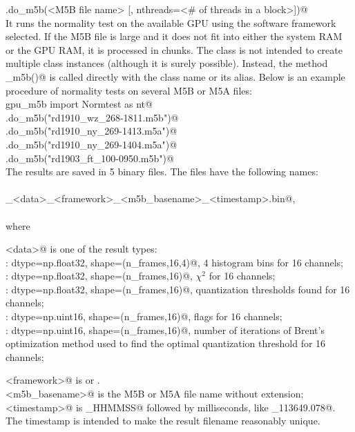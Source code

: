 \documentclass[letterpaper,twoside,12pt]{article}
\begin{document}
\noindent \verb@Normtest.do_m5b(<M5B file name> [, nthreads=<# of threads in a block>])@ \\

 It runs the normality test on the available GPU using the software framework selected. If the M5B file is large and it does not fit into either the system RAM or the GPU RAM, it is processed in chunks. The \verb@Normtest@ class is not intended to create multiple class instances (although it is surely possible). Instead, the method \verb@do_m5b()@ is called directly with the class name or its alias. Below is an example procedure of normality tests on several M5B or M5A files: \\

\noindent
\verb@from gpu_m5b import Normtest as nt@  \\
\verb@nt.do_m5b("rd1910_wz_268-1811.m5b")@ \\
\verb@nt.do_m5b("rd1910_ny_269-1413.m5a")@ \\
\verb@nt.do_m5b("rd1910_ny_269-1404.m5a")@ \\
\verb@nt.do_m5b("rd1903_ft_100-0950.m5b")@ \\

The results are saved in 5 binary files. The files have the following names: \\\\
\verb@nt_<data>_<framework>_<m5b_basename>_<timestamp>.bin@, \\\\
\noindent where

\noindent \verb@<data>@ is one of the result types: \\
\indent \verb@hist:   dtype=np.float32, shape=(n_frames,16,4)@, 4 histogram bins for 16 channels; \\
\indent {}:   dtype=np.float32, shape=(n_frames,16)@, $\chi^2$ for 16 channels; \\
\indent \verb@thresh: dtype=np.float32, shape=(n_frames,16)@, quantization thresholds found
        for 16 channels; \\
\indent \verb@flag:   dtype=np.uint16, shape=(n_frames,16)@, flags for 16 channels; \\
\indent \verb@niter:  dtype=np.uint16, shape=(n_frames,16)@, number of iterations of Brent's
        optimization method used to find the optimal quantization threshold
        for 16 channels;

\noindent \verb@<framework>@ is \verb@cuda@ or \verb@opencl@. \\
\noindent \verb@<m5b_basename>@ is the M5B or M5A file name without extension; \\
\noindent \verb@<timestamp>@ is \verb@YYYYMMDD_HHMMSS@ followed by milliseconds, like _113649.078@. The timestamp is intended to make the result filename reasonably unique. \\
\end{document}
